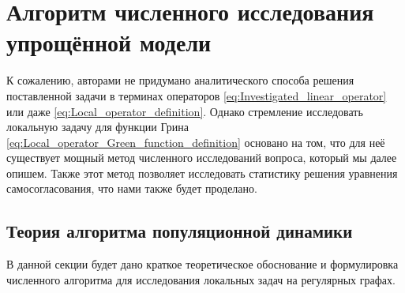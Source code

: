 \chapter{Алгоритм численного исследования упрощённой модели}  \label{Numer}
К сожалению, авторами не придумано аналитического способа решения поставленной задачи в терминах операторов \eqref{eq:Investigated_linear_operator} или даже \eqref{eq:Local_operator_definition}. Однако стремление исследовать локальную задачу для функции Грина \eqref{eq:Local_operator_Green_function_definition} основано на том, что для неё существует мощный метод численного исследований вопроса, который мы далее опишем. Также этот метод позволяет исследовать статистику решения уравнения самосогласования, что нами также будет проделано.



\section{Теория алгоритма популяционной динамики}
В данной секции будет дано краткое теоретическое обоснование и формулировка численного алгоритма для исследования локальных задач на регулярных графах.



